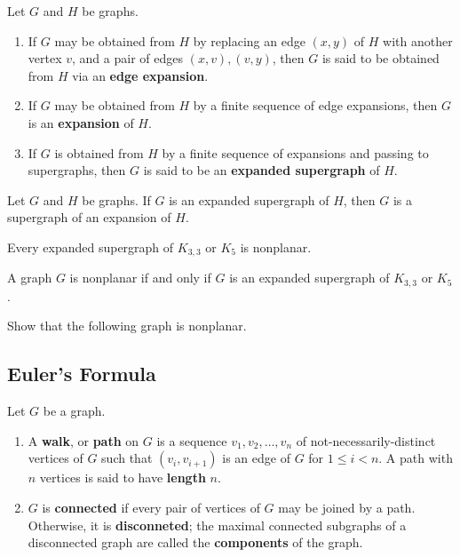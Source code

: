 \begin{definition} Let $G$ and $H$ be graphs.
\begin{enumerate}
    \item If $G$ may be obtained from $H$ by replacing an edge $(x, y)$ of $H$ with another vertex $v$, and a pair of edges $(x, v), (v, y)$, then $G$ is said to be obtained from $H$ via an \textbf{edge expansion}.
    \item If $G$ may be obtained from $H$ by a finite sequence of edge expansions, then $G$ is an \textbf{expansion} of $H$.
    \item If $G$ is obtained from $H$ by a finite sequence of expansions and passing to supergraphs, then $G$ is said to be an \textbf{expanded supergraph} of $H$.
\end{enumerate}
\end{definition}

\begin{theorem} Let $G$ and $H$ be graphs. If $G$ is an expanded supergraph of $H$, then $G$ is a supergraph of an expansion of $H$.
\end{theorem}

\begin{theorem} Every expanded supergraph of $K_{3,3}$ or $K_5$ is nonplanar.
\end{theorem}

\begin{theorem} A graph $G$ is nonplanar if and only if $G$ is an expanded supergraph of $K_{3,3}$ or $K_5$.
\end{theorem}

\begin{example} Show that the following graph is nonplanar.
\end{example}

\subsection{Euler's Formula}
\begin{definition} Let $G$ be a graph.
\begin{enumerate}
    \item A \textbf{walk}, or \textbf{path} on $G$ is a sequence $v_1, v_2, \ldots, v_n$ of not-necessarily-distinct vertices of $G$ such that $(v_i, v_{i+1})$ is an edge of $G$ for $1\leq i <n$.  A path with $n$ vertices is said to have \textbf{length} $n$.
    \item $G$ is \textbf{connected} if every pair of vertices of $G$ may be joined by a path.  Otherwise, it is \textbf{disconneted}; the maximal connected subgraphs of a disconnected graph are called the \textbf{components} of the graph.
\end{enumerate}
\end{definition}

